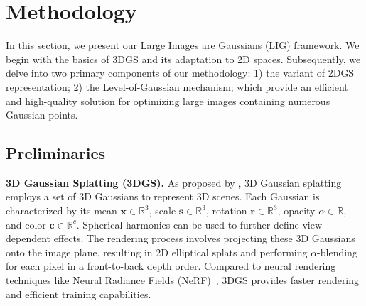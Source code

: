 \section{Methodology}

In this section, we present our Large Images are Gaussians (LIG) framework. We begin with the basics of 3DGS and its adaptation to 2D spaces. Subsequently, we delve into two primary components of our methodology: 1) the variant of 2DGS representation; 2) the Level-of-Gaussian mechanism; which provide an efficient and high-quality solution for optimizing large images containing numerous Gaussian points.

\subsection{Preliminaries}
\noindent \textbf{3D Gaussian Splatting (3DGS).} 
As proposed by \cite{kerbl20233d}, 3D Gaussian splatting employs a set of 3D Gaussians to represent 3D scenes. Each Gaussian is characterized by its mean
\( \bm x \in \mathbb{R}^{3}\), scale \(\bm s \in \mathbb{R}^{3}\), rotation $\bm r \in \mathbb{R}^{3}$, opacity $\alpha \in \mathbb{R}$, and color $\bm c \in \mathbb{R}^{c}$. Spherical harmonics can be used to further define view-dependent effects. The rendering process involves projecting these 3D Gaussians onto the image plane, resulting in 2D elliptical splats and performing $\alpha$-blending for each pixel in a front-to-back depth order. Compared to neural rendering techniques like Neural Radiance Fields (NeRF)~\cite{mildenhall2021nerf}, 3DGS provides faster rendering and efficient training capabilities.

